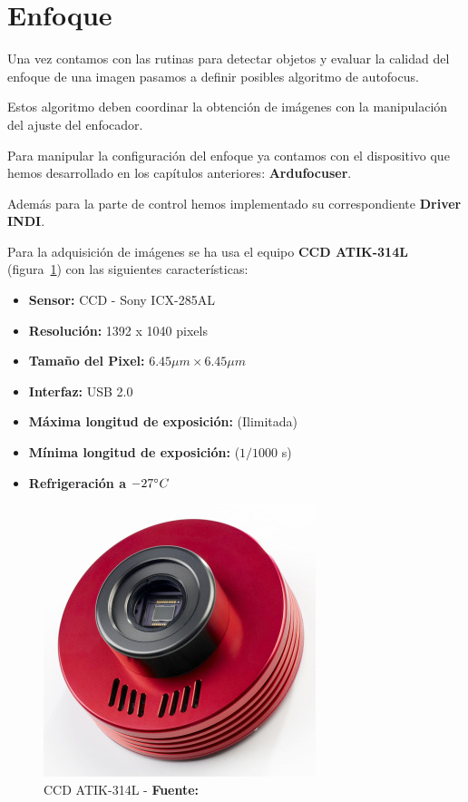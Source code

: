 \section{Enfoque}

Una vez contamos con las rutinas para detectar objetos y evaluar la calidad del enfoque de una imagen pasamos a definir posibles algoritmo de autofocus.

Estos algoritmo deben coordinar la obtención de imágenes con la manipulación del ajuste del enfocador.


Para manipular la configuración del enfoque ya contamos con el dispositivo que hemos desarrollado en los capítulos anteriores: \textbf{Ardufocuser}.

Además para la parte de control hemos implementado su correspondiente \textbf{Driver INDI}.

Para la adquisición de imágenes se ha usa el equipo  \textbf{CCD ATIK-314L} \cite{atik314l} (figura~\ref{fig:ccd2}) con las siguientes características:

\begin{itemize}
	\item \textbf{Sensor:} CCD - Sony ICX-285AL
	\item \textbf{Resolución:} 1392 x 1040 pixels
	\item \textbf{Tamaño del Pixel:}  $ 6.45 \mu m \times 6.45 \mu m$
	\item \textbf{Interfaz:} USB 2.0 
	\item \textbf{Máxima longitud de exposición:} (Ilimitada)
	\item \textbf{Mínima longitud de exposición:} ($1/1000$ s)
	\item \textbf{Refrigeración a $ -27 \degree C $}
	
\end{itemize}





\begin{figure}
	\centering
	\includegraphics[width=0.7\linewidth]{../images/ccd2}
	\caption[CCD ATIK-314L]{CCD ATIK-314L - \textbf{Fuente:} \cite{Atik364:online} }
	\label{fig:ccd2}
\end{figure} 



